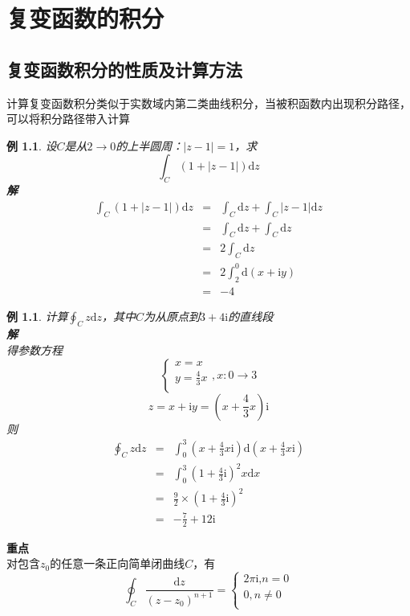 \documentclass[12pt, a4paper, twoside]{ctexbook}
\newtheorem{example}[theorem]{例}
\begin{document}
\chapter{复变函数的积分}
\newpage
\section{复变函数积分的性质及计算方法}
计算复变函数积分类似于实数域内第二类曲线积分，当被积函数内出现积分路径，可以将积分路径带入计算
\begin{example}
	设$C$是从$2\to0$的上半圆周：$\left|z-1\right|=1$，求
	$$
	\int_C\left(1+\left|z-1\right|\right)\mathrm{d}z
	$$
	\hspace*{1em}\textbf{解}
    \begin{eqnarray}
        \int_C\left(1+\left|z-1\right|\right)\mathrm{d}z&=&\int_C\mathrm{d}z+\int_C\left|z-1\right|\mathrm{d}z \nonumber      \\
        ~&=&\int_C\mathrm{d}z+\int_C\mathrm{d}z  \nonumber    \\
        ~&=&2\int_C\mathrm{d}z \nonumber		\\
		~&=&2\int_2^0\mathrm{d}\left(x+\mathrm{i}y\right) \nonumber  \\
		~&=&-4 \nonumber
    \end{eqnarray}
\end{example}

\begin{example}
	计算$\oint_C z\mathrm{d}z$，其中$C$为从原点到$3+4\mathrm{i}$的直线段\\
	\hspace*{1em}\textbf{解}\\
    \hspace*{2em}得参数方程
	$$
	\left\{ \begin{array}{l}
		x=x\\
		y=\frac{4}{3}x\\
	\end{array},x:0\rightarrow 3 \right. 
	$$
	$$
	z=x+\mathrm{i}y=\left( x+\frac{4}{3}x\right) \mathrm{i}
	$$
	\hspace*{2em}则
    \begin{eqnarray}
        \oint_C z\mathrm{d}z&=&\int_0^3\left(x+\frac{4}{3}x\mathrm{i}\right)\mathrm{d}\left(x+\frac{4}{3}x\mathrm{i}\right) \nonumber      \\
        ~&=&\int_0^3\left(1+\frac{4}{3}\mathrm{i}\right)^2x\mathrm{d}x \nonumber    \\
        ~&=&\frac{9}{2}\times \left(1+\frac{4}{3}\mathrm{i}\right)^2 \nonumber		\\
		~&=&-\frac{7}{2}+12\mathrm{i} \nonumber
    \end{eqnarray}
\end{example}
\textbf{重点}\\
对包含$z_0$的任意一条正向简单闭曲线$C$，有
$$
\oint_C{\frac{\text{d}z}{\left( z-z_0 \right) ^{n+1}}}=\left\{ \begin{array}{l}
	2\pi \text{i,}n=0\\
	0,n\neq 0\\
\end{array} \right. 
$$
\end{document}
